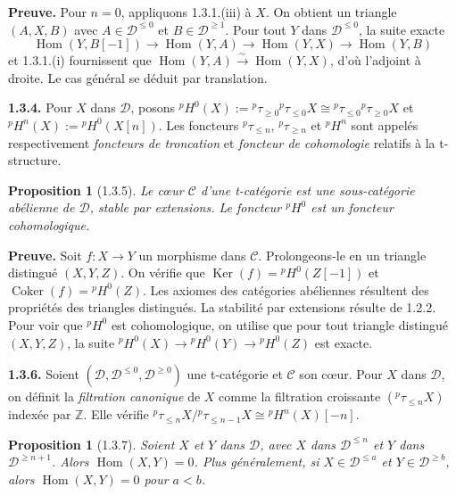 \documentclass[12pt,a4paper]{article}
\theoremstyle{plain}
\newtheorem{proposition}[theorem]{Proposition}
\theoremstyle{definition}
\theoremstyle{remark}
\DeclareMathOperator{\Hom}{Hom}
\DeclareMathOperator{\Ker}{Ker}
\DeclareMathOperator{\Coker}{Coker}
\newcommand{\ZZ}{\mathbb{Z}}
\newcommand{\cC}{\mathcal{C}}
\newcommand{\cD}{\mathcal{D}}
\begin{document}
\noindent
\textbf{Preuve.} Pour $n = 0$, appliquons 1.3.1.(iii) à $X$. On obtient un triangle $(A, X, B)$ avec $A \in \cD^{\leq 0}$ et $B \in \cD^{\geq 1}$. Pour tout $Y$ dans $\cD^{\leq 0}$, la suite exacte
\[
\Hom(Y, B[-1]) \to \Hom(Y, A) \to \Hom(Y, X) \to \Hom(Y, B)
\]
et 1.3.1.(i) fournissent que $\Hom(Y, A) \xrightarrow{\sim} \Hom(Y, X)$, d'où l'adjoint à droite. Le cas général se déduit par translation.

\smallskip

\noindent
\textbf{1.3.4.} Pour $X$ dans $\cD$, posons ${}^{p}H^{0}(X) := {}^{p}\tau_{\geq 0}{}^{p}\tau_{\leq 0}X \cong {}^{p}\tau_{\leq 0}{}^{p}\tau_{\geq 0}X$ et ${}^{p}H^{n}(X) := {}^{p}H^{0}(X[n])$. Les foncteurs ${}^{p}\tau_{\leq n}$, ${}^{p}\tau_{\geq n}$ et ${}^{p}H^{n}$ sont appelés respectivement \emph{foncteurs de troncation} et \emph{foncteur de cohomologie} relatifs à la t-structure.

\smallskip

\begin{proposition}[1.3.5]
Le cœur $\cC$ d'une t-catégorie est une sous-catégorie abélienne de $\cD$, stable par extensions. Le foncteur ${}^{p}H^{0}$ est un foncteur cohomologique.
\end{proposition}

\smallskip

\noindent
\textbf{Preuve.} Soit $f : X \to Y$ un morphisme dans $\cC$. Prolongeons-le en un triangle distingué $(X, Y, Z)$. On vérifie que $\Ker(f) = {}^{p}H^{0}(Z[-1])$ et $\Coker(f) = {}^{p}H^{0}(Z)$. Les axiomes des catégories abéliennes résultent des propriétés des triangles distingués. La stabilité par extensions résulte de 1.2.2. Pour voir que ${}^{p}H^{0}$ est cohomologique, on utilise que pour tout triangle distingué $(X, Y, Z)$, la suite ${}^{p}H^{0}(X) \to {}^{p}H^{0}(Y) \to {}^{p}H^{0}(Z)$ est exacte.

\smallskip

\noindent
\textbf{1.3.6.} Soient $(\cD, \cD^{\leq 0}, \cD^{\geq 0})$ une t-catégorie et $\cC$ son cœur. Pour $X$ dans $\cD$, on définit la \emph{filtration canonique} de $X$ comme la filtration croissante $({}^{p}\tau_{\leq n}X)$ indexée par $\ZZ$. Elle vérifie ${}^{p}\tau_{\leq n}X / {}^{p}\tau_{\leq n-1}X \cong {}^{p}H^{n}(X)[-n]$.

\smallskip

\begin{proposition}[1.3.7]
Soient $X$ et $Y$ dans $\cD$, avec $X$ dans $\cD^{\leq n}$ et $Y$ dans $\cD^{\geq n+1}$. Alors $\Hom(X, Y) = 0$. Plus généralement, si $X \in \cD^{\leq a}$ et $Y \in \cD^{\geq b}$, alors $\Hom(X, Y) = 0$ pour $a < b$.
\end{proposition}
\end{document}
